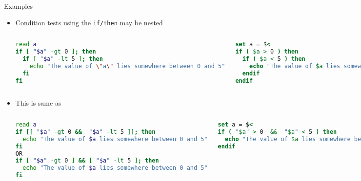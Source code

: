 \documentclass[slidestop,mathserif,compress,xcolor=svgnames]{beamer}
\newenvironment{bblock}[0]
{
\begin{beamerboxesrounded}[upper=uppercol1,lower=lowercol1,shadow=true]}
{\end{beamerboxesrounded}}
\newenvironment{eblock}[0]
{
\begin{beamerboxesrounded}[upper=uppercol2,lower=lowercol2,shadow=true]}
{\end{beamerboxesrounded}}
\begin{document}
\begin{frame}[fragile]{\small Examples}
  \begin{itemize}
    \item Condition tests using the \texttt{if/then} may be nested
      \begin{columns}
        \begin{eblock}{}
      \begin{lstlisting}[language=bash]
read a
if [ "$a" -gt 0 ]; then
  if [ "$a" -lt 5 ]; then
    echo "The value of \"a\" lies somewhere between 0 and 5"
  fi
fi
      \end{lstlisting}
        \end{eblock}
        \begin{bblock}{}
      \begin{lstlisting}[language=csh]
set a = $<
if ( $a > 0 ) then
  if ( $a < 5 ) then
    echo "The value of $a lies somewhere between 0 and 5"
  endif
endif
      \end{lstlisting}
        \end{bblock}
      \end{columns}
    \item This is same as 
      \begin{columns}
        \begin{eblock}{}
      \begin{lstlisting}[language=bash]
read a
if [[ "$a" -gt 0 &&  "$a" -lt 5 ]]; then
  echo "The value of $a lies somewhere between 0 and 5"
fi
OR
if [ "$a" -gt 0 ] && [ "$a" -lt 5 ]; then
  echo "The value of $a lies somewhere between 0 and 5"
fi
      \end{lstlisting}
        \end{eblock}
        \begin{bblock}{}
      \begin{lstlisting}[language=csh]
set a = $<
if ( "$a" > 0  &&  "$a" < 5 ) then
  echo "The value of $a lies somewhere between 0 and 5"
endif
      \end{lstlisting}
        \end{bblock}
      \end{columns}
  \end{itemize}
\end{frame}
\end{document}
